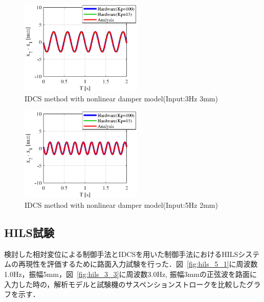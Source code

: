 \documentclass[a4paper,12pt]{article_vdlab_sotsuron}
\begin{document}
\vspace{2mm}
\begin{figure}[htp]
  \begin{center}
    \includegraphics[height=45mm]{figure/sim_idcs_3_3_nonlinear.eps}
    \caption{IDCS method with nonlinear damper model(Input:3Hz 3mm)}
    \label{fig:sim_idcs_3_3_nonlinear}
  \end{center}
\end{figure}

\vspace{2mm}
\begin{figure}[htp]
  \begin{center}
    \includegraphics[height=45mm]{figure/sim_idcs_2_5_nonlinear.eps}
    \caption{IDCS method with nonlinear damper model(Input:5Hz 2mm)}
    \label{fig:sim_idcs_2_5_nonlinear}
  \end{center}
\end{figure}

\newpage
\subsection{HILS試験}
検討した相対変位による制御手法とIDCSを用いた制御手法におけるHILSシステムの再現性を評価するために路面入力試験を行った．図~\ref{fig:hils_5_1}に周波数1.0Hz，振幅5mm，図~\ref{fig:hils_3_3}に周波数3.0Hz, 振幅3mmの正弦波を路面に入力した時の，解析モデルと試験機のサスペンションストロークを比較したグラフを示す．
\end{document}
